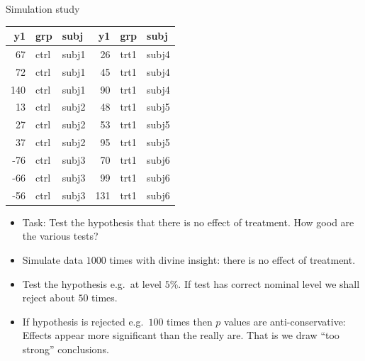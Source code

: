 \documentclass[
  ignorenonframetext,
]{beamer}
\begin{document}
\begin{frame}{Simulation study}
\protect\hypertarget{simulation-study}{}

\small

\begin{tabular}{rllrll}
\toprule
y1 & grp & subj & y1 & grp & subj\\
\midrule
67 & ctrl & subj1 & 26 & trt1 & subj4\\
72 & ctrl & subj1 & 45 & trt1 & subj4\\
140 & ctrl & subj1 & 90 & trt1 & subj4\\
13 & ctrl & subj2 & 48 & trt1 & subj5\\
27 & ctrl & subj2 & 53 & trt1 & subj5\\
37 & ctrl & subj2 & 95 & trt1 & subj5\\
-76 & ctrl & subj3 & 70 & trt1 & subj6\\
-66 & ctrl & subj3 & 99 & trt1 & subj6\\
-56 & ctrl & subj3 & 131 & trt1 & subj6\\
\bottomrule
\end{tabular}

\begin{block}{\normalsize}

\begin{itemize}
\item
  Task: Test the hypothesis that there is no effect of treatment. How
  good are the various tests?
\item
  Simulate data \(1000\) times with divine insight: there is no effect
  of treatment.
\item
  Test the hypothesis e.g.~at level \(5\%\). If test has correct nominal
  level we shall reject about \(50\) times.
\item
  If hypothesis is rejected e.g.~\(100\) times then \(p\) values are
  anti-conservative: Effects appear more significant than the really
  are. That is we draw ``too strong'' conclusions.
\end{itemize}

\end{block}

\end{frame}
\end{document}

